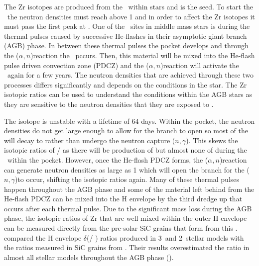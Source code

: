 \documentclass[fleqn,usenatbib]{mnras}
\begin{document}
The Zr isotopes are produced from the \spr~within stars and \iron[56] is the seed. To start the \spr~the neutron densities must reach above 1   and in order to affect the Zr isotopes it must pass the first peak at \strontium[88]. One of the \spr~sites in middle mass stars is during the thermal pulses caused by successive He-flashes in their asymptotic giant branch (AGB) phase. In between these thermal pulses the \carbon[13] pocket develops and through the \carbon[13]($\alpha,n$)\oxygen[16] reaction the \spr~pccurs. Then, this material will be mixed into the He-flash pulse driven convection zone (PDCZ) and the \neon[22]($\alpha,n$)\magnesium[25] reaction will activate the \spr~again for a few years. The neutron densities that are achieved through these two processes differs significantly and depends on the conditions in the star. The Zr isotopic ratios can be used to understand the conditions within the AGB stars as they are sensitive to the neutron densities that they are exposed to \citep{zr}.

The \zirconium[95] isotope is unstable with a lifetime of 64 days. Within the \carbon[13] pocket, the neutron densities do not get large enough to allow for the \zirconium[95] branch to open so most of the \zirconium[95] will decay to \molybdenum[95] rather than undergo the neutron capture \zirconium[95]($n,\gamma$)\zirconium[96]. This skews the isotopic ratios of \zirconium[96] / \zirconium[94] as there will be production of \zirconium[94] but almost none of \zirconium[96] during the \spr~within the \carbon[13] pocket. However, once the He-flash PDCZ forms, the \neon[22]($\alpha,n$)\magnesium[25] reaction can generate neutron densities as large as 1  which will open the branch for the \zirconium[95]($n,\gamma$)\zirconium[96] to occur, shifting the isotopic ratios again. Many of these thermal pulses happen throughout the AGB phase and some of the material left behind from the He-flash PDCZ can be mixed into the H envelope by the third dredge up that occurs after each thermal pulse. Due to the significant mass loss during the AGB phase, the isotopic ratios of Zr that are well mixed within the outer H envelope can be measured directly from the pre-solar SiC grains that form from this \citep{grain}. \citet{zr} compared the H envelope $\delta$(\zirconium[96] / \zirconium[94]) ratios produced in 3\Msun~and 2\Msun~stellar models with the ratios measured in SiC grains from \citet{grain}. Their results overestimated the ratio in almost all stellar models throughout the AGB phase ().
\end{document}
